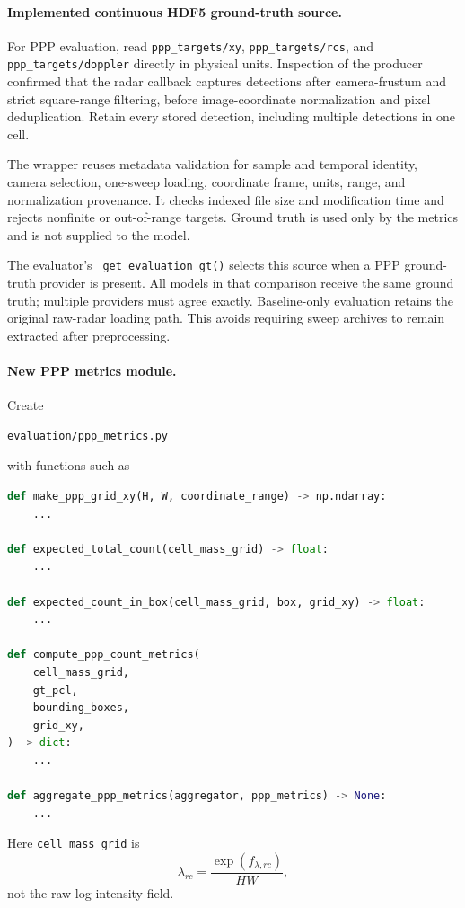\documentclass[11pt,a4paper]{article}
\begin{document}
\paragraph{Implemented continuous HDF5 ground-truth source.}
For PPP evaluation, read \texttt{ppp\_targets/xy},
\texttt{ppp\_targets/rcs}, and \texttt{ppp\_targets/doppler} directly
in physical units. Inspection of the producer confirmed that the radar
callback captures detections after camera-frustum and strict square-range
filtering, before image-coordinate normalization and pixel deduplication.
Retain every stored detection, including multiple detections in one cell.

The wrapper reuses metadata validation for sample and temporal identity,
camera selection, one-sweep loading, coordinate frame, units, range,
and normalization provenance. It checks indexed file size and modification
time and rejects nonfinite or out-of-range targets. Ground truth is used
only by the metrics and is not supplied to the model.

The evaluator's \texttt{\_get\_evaluation\_gt()} selects this source when
a PPP ground-truth provider is present. All models in that comparison
receive the same ground truth; multiple providers must agree exactly.
Baseline-only evaluation retains the original raw-radar loading path.
This avoids requiring sweep archives to remain extracted after preprocessing.

\paragraph{New PPP metrics module.}
Create
\begin{lstlisting}
evaluation/ppp_metrics.py
\end{lstlisting}
with functions such as
\begin{lstlisting}[language=Python]
def make_ppp_grid_xy(H, W, coordinate_range) -> np.ndarray:
    ...

def expected_total_count(cell_mass_grid) -> float:
    ...

def expected_count_in_box(cell_mass_grid, box, grid_xy) -> float:
    ...

def compute_ppp_count_metrics(
    cell_mass_grid,
    gt_pcl,
    bounding_boxes,
    grid_xy,
) -> dict:
    ...

def aggregate_ppp_metrics(aggregator, ppp_metrics) -> None:
    ...
\end{lstlisting}

Here \texttt{cell\_mass\_grid} is
\[
    \lambda_{rc}
    =
    \frac{\exp(f_{\lambda,rc})}{HW},
\]
not the raw log-intensity field.
\end{document}
